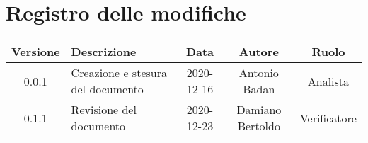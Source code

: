 \section*{Registro delle modifiche}

\begin{center}
	\begin{longtable}{|c|p{5cm}|c|c|c|}
	\hline
	\rowcolor{lighter-grayer}
	\textbf{Versione} & \textbf{Descrizione} & \textbf{Data} & \textbf{Autore} & \textbf{Ruolo} \\
	\hline
	\endfirsthead


	\hline
	0.0.1 & Creazione e stesura del documento & 2020-12-16 & Antonio Badan & Analista \\
	\hline
	0.1.1 & Revisione del documento & 2020-12-23 & Damiano Bertoldo & Verificatore \\
	\hline

	\end{longtable}
\end{center}